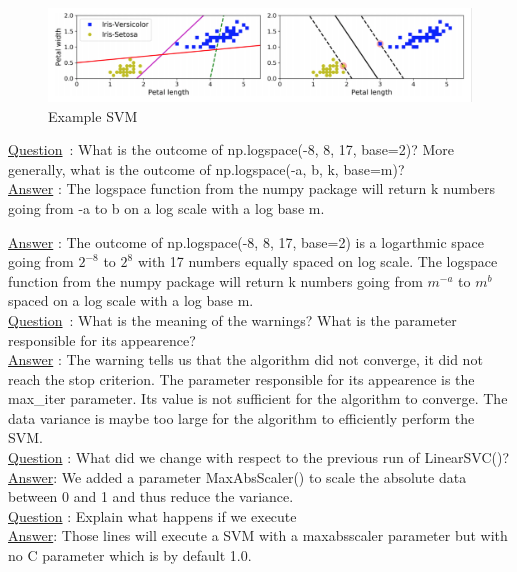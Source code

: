 \begin{figure}[ht]
	\centering 
	\includegraphics[scale = 0.35]{Pics/SVM}
	\caption{Example SVM}
\end{figure}

\underline{Question} : What is the outcome of np.logspace(-8, 8, 17, base=2)? More generally, what is the outcome of np.logspace(-a, b, k, base=m)?\\


\underline{Answer} : The logspace function from the numpy package will return k numbers going from -a to b on a log scale with a log base m. 

\underline{Answer} : The outcome of np.logspace(-8, 8, 17, base=2) is a logarthmic space going from $2^{-8}$ to $2^8$ with 17 numbers equally spaced on log scale.
 The logspace function from the numpy package will return k numbers going from $m^{-a}$ to $m^b$ spaced on a log scale with a log base m. \\

\underline{Question} : What is the meaning of the warnings? What is the parameter responsible for its appearence? \\
 \underline{Answer} : The warning tells us that the algorithm did not converge, it did not reach the stop criterion. The parameter responsible for its appearence is the max_iter parameter. Its value is not sufficient for the algorithm to converge. The data variance is maybe too large for the algorithm to efficiently perform the SVM. \\

\underline{Question} : What did we change with respect to the previous run of LinearSVC()? \\
\underline{Answer}: We added a parameter MaxAbsScaler() to scale the absolute data between 0 and 1 and thus reduce the variance. \\

\underline{Question} : Explain what happens if we execute \\
\underline{Answer}: Those lines will execute a SVM with a maxabsscaler parameter but with no C parameter which is by default 1.0.\\

